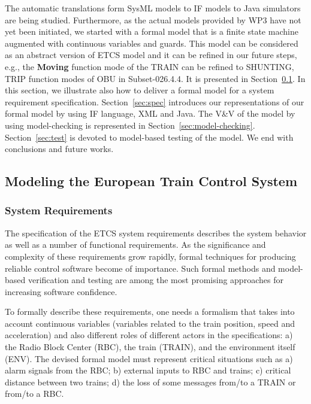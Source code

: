 \documentclass{template/openetcs_article}
\begin{document}
The automatic translations form SysML models to IF models to Java simulators are being studied. Furthermore, as the actual models provided by WP3 have not yet been initiated, we started with a formal model that is a finite state machine augmented with continuous variables and guards. This model can be considered as an abstract version of ETCS model and it can be refined in our future steps, e.g., the {\bf Moving} function mode of the TRAIN can be refined to SHUNTING, TRIP function modes of OBU in Subset-026.4.4.
It is presented in Section~\ref{sec:model}.
In this section, we illustrate also how to deliver a formal model for a system requirement specification.
Section~\ref{sec:spec} introduces our representations of our formal model by using IF language, XML and Java. The V\&V of the model by using model-checking is represented in Section~\ref{sec:model-checking}. Section~\ref{sec:test} is devoted to model-based testing of the model.
We end with conclusions and future works.

\subsection{Modeling the European Train Control System}
\label{sec:model}

\subsubsection{System Requirements}

The specification of the ETCS system requirements describes the system behavior as well as a number of functional requirements. As the significance and complexity of these requirements grow rapidly, formal techniques for producing reliable control software become of importance. Such formal methods and model-based verification and testing are among the most promising approaches for increasing software confidence.

To formally describe these requirements, one needs a formalism that takes into account continuous variables (variables related to the train position, speed and acceleration) and also different roles of different actors in the specifications: a) the Radio Block Center (RBC), the train (TRAIN), and the environment itself (ENV). The devised formal model must represent critical situations such as a) alarm signals from the RBC; b) external inputs to RBC and trains; c) critical distance between two trains; d) the loss of some messages from/to a TRAIN or from/to a RBC.  
\end{document}
